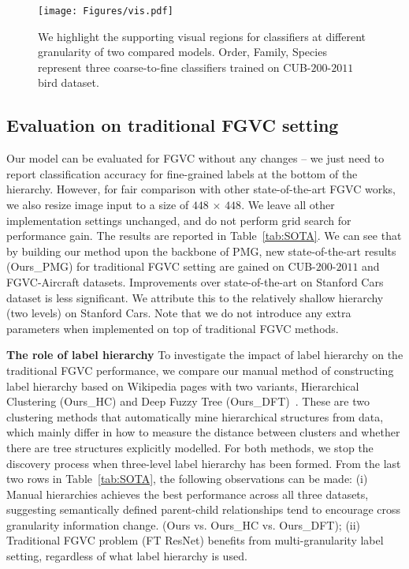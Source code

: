 \documentclass[final]{cvpr}
\newcommand{\keypoint}[1]{\vspace{0.05cm}\noindent\textbf{#1}\quad}
\begin{document}
\begin{figure*}[t]
\begin{center}
\texttt{[image: Figures/vis.pdf]}
\end{center}

  \caption{We highlight the supporting visual regions for classifiers at different granularity of two compared models. Order, Family, Species represent three coarse-to-fine classifiers trained on CUB-$200$-$2011$ bird dataset.}
\label{fig:vis}
\vspace{-5mm}
\end{figure*}


\subsection{Evaluation on traditional FGVC setting}
Our model can be evaluated for FGVC without any changes -- we just need to report classification accuracy for fine-grained labels at the bottom of the hierarchy. However, for fair comparison with other state-of-the-art FGVC works, we also resize image input to a size of $448$ $\times$ $448$. We leave all other implementation settings unchanged, and do not perform grid search for performance gain. The results are reported in Table~\ref{tab:SOTA}. We can see that by building our method upon the backbone of PMG, new state-of-the-art results (Ours\_PMG) for traditional FGVC setting are gained on CUB-$200$-$2011$ and FGVC-Aircraft datasets. Improvements over state-of-the-art on Stanford Cars dataset is less significant. We attribute this to the relatively shallow hierarchy (two levels) on Stanford Cars. Note that we do not introduce any extra parameters when implemented on top of traditional FGVC methods. 


\keypoint{The role of label hierarchy}  To investigate the impact of label hierarchy on the traditional FGVC performance, we compare our manual method of constructing label hierarchy based on Wikipedia pages with two variants, Hierarchical Clustering (Ours\_HC) and Deep Fuzzy Tree (Ours\_DFT)~\cite{wang2019deep}. These are two clustering methods that automatically mine hierarchical structures from data, which mainly differ in how to measure the distance between clusters and whether there are tree structures explicitly modelled. For both methods, we stop the discovery process when three-level label hierarchy has been formed. From the last two rows in Table~\ref{tab:SOTA}, the following observations can be made: (i) Manual hierarchies achieves the best performance across all three datasets, suggesting semantically defined parent-child relationships tend to encourage cross granularity information change. (Ours vs. Ours\_HC vs. Ours\_DFT); (ii) Traditional FGVC problem (FT ResNet) benefits from multi-granularity label setting, regardless of what label hierarchy is used.
\end{document}
